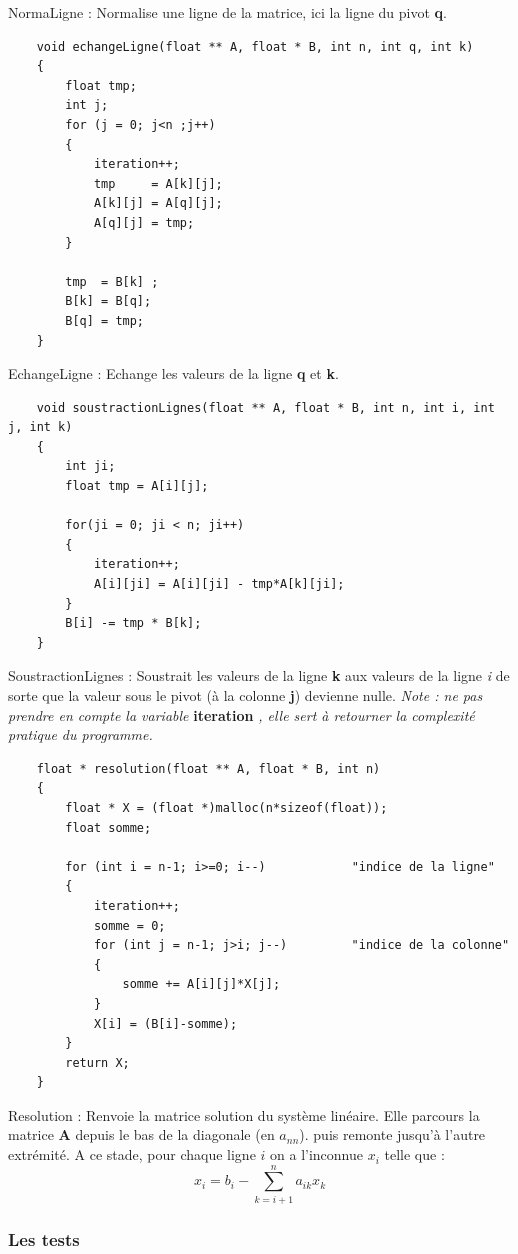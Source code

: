 \documentclass[a4paper]{article}
\begin{document}
NormaLigne : Normalise une ligne de la matrice, ici la ligne du pivot \textbf{q}.

\begin{lstlisting}
	void echangeLigne(float ** A, float * B, int n, int q, int k)
	{
		float tmp;
		int j;
		for (j = 0; j<n ;j++)
		{
			iteration++;
			tmp     = A[k][j];
			A[k][j] = A[q][j];
			A[q][j] = tmp;
		} 
		
		tmp  = B[k] ;
		B[k] = B[q];
		B[q] = tmp;
	}
\end{lstlisting}

EchangeLigne : Echange les valeurs de la ligne \textbf{q} et \textbf{k}.

\begin{lstlisting}
	void soustractionLignes(float ** A, float * B, int n, int i, int j, int k)
	{
		int ji;
		float tmp = A[i][j];
		
		for(ji = 0; ji < n; ji++)
		{
			iteration++;
			A[i][ji] = A[i][ji] - tmp*A[k][ji];
		}
		B[i] -= tmp * B[k];
	}
\end{lstlisting}

SoustractionLignes : Soustrait les valeurs de la ligne \textbf{k} aux valeurs de la ligne \textit{i} de sorte que la valeur sous le pivot (à la colonne \textbf{j}) devienne nulle.
\newline
\textit{Note : ne pas prendre en compte la variable} \textbf{iteration} \textit{, elle sert à retourner la complexité pratique du programme.}
\clearpage
\begin{lstlisting}
	float * resolution(float ** A, float * B, int n)
	{
		float * X = (float *)malloc(n*sizeof(float)); 			
		float somme;
		
		for (int i = n-1; i>=0; i--)			"indice de la ligne"
		{
			iteration++;
			somme = 0;
			for (int j = n-1; j>i; j--)			"indice de la colonne"
			{
				somme += A[i][j]*X[j];
			}
			X[i] = (B[i]-somme);
		}
		return X;
	}
\end{lstlisting}

Resolution : Renvoie la matrice solution du système linéaire. Elle parcours la matrice \textbf{A} depuis le bas de la diagonale (en $a_{nn}$). puis remonte jusqu'à l'autre extrémité.
A ce stade, pour chaque ligne $i$ on a l'inconnue $x_i$ telle que :
\[x_i = b_i - \sum_{k = i+1}^{n}a_{ik}x_k\]


\subsubsection{Les tests}
\end{document}
